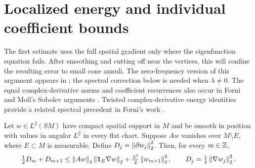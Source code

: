 \section{Localized energy and individual coefficient bounds}\label{sec:energy}

The first estimate uses the full spatial gradient only where the
eigenfunction equation fails. After smoothing and cutting off near
the vertices, this will confine the resulting error to small cone
annuli. The zero-frequency version of this argument appears in
\cite[Sections~3--4]{Companion}; the spectral correction below is
needed when \(\lambda\ne0\). The equal complex-derivative norms and
coefficient recurrences also occur in Forni and Moll's Sobolev
arguments \cite[Lemma~3.3, Corollary~4.2, and Lemma~5.1]{FM}.
Twisted complex-derivative energy identities provide a related
spectral precedent in Forni's work \cite[Section~3]{Forni2022}.

\begin{lemma}\label{lem:energy}
Let \(w\in L^2(SM)\) have compact spatial support in \(M\) and be
smooth in position with values in angular \(L^2\) in every flat chart.
Suppose \(Aw\) vanishes over \(M\setminus E\), where \(E\subset M\)
is measurable. Define
\(D_j=\left\lVert\partial w_j\right\rVert_2^2\). Then, for every \(m\in\mathbb Z\),
\begin{equation}\label{eq:localized-energy}
 \tfrac12D_m+D_{m+1}
 \le \left\lVert Aw\right\rVert_2\left\lVert\mathbf 1_E\nabla w\right\rVert_2
       +\tfrac{\lambda^2}{2}\left\lVert w_{m+1}\right\rVert_2^2,
 \qquad
 D_j=\tfrac14\left\lVert\nabla w_j\right\rVert_2^2.
\end{equation}
\end{lemma}

